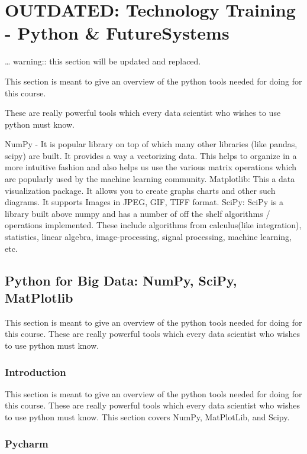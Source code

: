 \FILENAME

\section{OUTDATED: Technology Training - Python \&
FutureSystems}\label{outdated-technology-training---python-futuresystems}

\ldots{} warning:: this section will be updated and replaced.

This section is meant to give an overview of the python tools needed for
doing for this course.

These are really powerful tools which every data scientist who wishes to
use python must know.

NumPy - It is popular library on top of which many other libraries (like
pandas, scipy) are built. It provides a way a vectorizing data. This
helps to organize in a more intuitive fashion and also helps us use the
various matrix operations which are popularly used by the machine
learning community. Matplotlib: This a data visualization package. It
allows you to create graphs charts and other such diagrams. It supports
Images in JPEG, GIF, TIFF format. SciPy: SciPy is a library built above
numpy and has a number of off the shelf algorithms / operations
implemented. These include algorithms from calculus(like integration),
statistics, linear algebra, image-processing, signal processing, machine
learning, etc.

\subsection{Python for Big Data: NumPy, SciPy,
MatPlotlib}\label{python-for-big-data-numpy-scipy-matplotlib}

This section is meant to give an overview of the python tools needed for
doing for this course. These are really powerful tools which every data
scientist who wishes to use python must know.

\subsubsection{Introduction}\label{introduction}

This section is meant to give an overview of the python tools needed for
doing for this course. These are really powerful tools which every data
scientist who wishes to use python must know. This section covers NumPy,
MatPlotLib, and Scipy.

\subsubsection{Pycharm}\label{pycharm}

